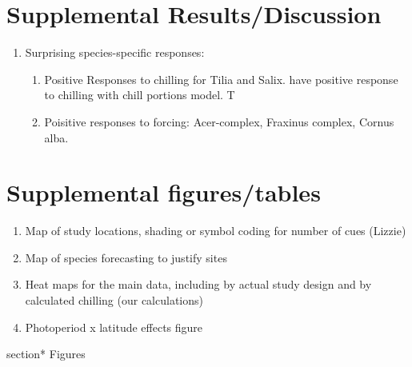 \documentclass{article}
\begin{document}
\section*{Supplemental Results/Discussion}
\begin{enumerate}
\item Surprising species-specific responses: 
\begin{enumerate}
\item Positive Responses to chilling for Tilia and Salix.  have positive response to chilling with chill portions model. T

\item Poisitive responses to forcing: Acer-complex, Fraxinus complex, Cornus alba.
\end{enumerate}
\end{enumerate}

\section*{Supplemental figures/tables}
\begin{enumerate}
\item Map of study locations, shading or symbol coding for number of cues (Lizzie)
\item Map of species forecasting to justify sites
\item Heat maps for the main data, including by actual study design and by calculated chilling (our calculations)
\item Photoperiod x latitude effects figure

\end{enumerate}

section* {Figures}

\newpage
\end{document}
